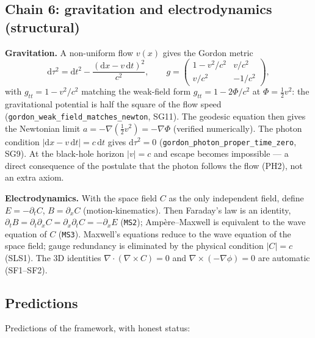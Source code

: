 \documentclass[aps,prd,preprint,superscriptaddress,amsmath,amssymb]{revtex4-2}
\begin{document}
\subsection{Chain 6: gravitation and electrodynamics (structural)}
\label{app:chain6}

\textbf{Gravitation.}  A non-uniform flow $v(x)$ gives the Gordon metric
\cite{gordon1923lichtfortpflanzung}
\begin{equation}
\mathrm d\tau^2=\mathrm dt^2-\frac{(\mathrm dx-v\,\mathrm dt)^2}{c^2},
\qquad g=\begin{pmatrix}1-v^2/c^2 & v/c^2\\ v/c^2 & -1/c^2\end{pmatrix},
\label{eq:gordon}
\end{equation}
with $g_{tt}=1-v^2/c^2$ matching the weak-field form
$g_{tt}=1-2\Phi/c^2$ at $\Phi=\tfrac12 v^2$: the gravitational potential
is half the square of the flow speed (\texttt{gordon\_weak\_field\_matches\_newton},
SG11).  The geodesic equation then gives the Newtonian limit
$a=-\nabla(\tfrac12 v^2)=-\nabla\Phi$ (verified numerically).  The
photon condition $|\mathrm dx-v\,\mathrm dt|=c\,\mathrm dt$ gives
$\mathrm d\tau^2=0$ (\texttt{gordon\_photon\_proper\_time\_zero}, SG9).
At the black-hole horizon $|v|=c$ and escape becomes impossible --- a
direct consequence of the postulate that the photon follows the flow
(PH2), not an extra axiom.

\textbf{Electrodynamics.}  With the space field $C$ as the only
independent field, define $E=-\partial_t C$, $B=\partial_x C$
(motion-kinematics).  Then Faraday's law is an identity,
$\partial_t B=\partial_t\partial_x C=\partial_x\partial_t C=-\partial_x E$
(\texttt{MS2}); Amp\`ere--Maxwell is equivalent to the wave equation of
$C$ (\texttt{MS3}).  Maxwell's equations reduce to the wave equation of
the space field; gauge redundancy is eliminated by the physical condition
$|C|=c$ (SLS1).  The 3D identities
$\nabla\cdot(\nabla\times C)=0$ and $\nabla\times(-\nabla\phi)=0$ are
automatic (SF1--SF2).

\subsection{Predictions}
\label{app:predictions}

Predictions of the framework, with honest status:
\end{document}
